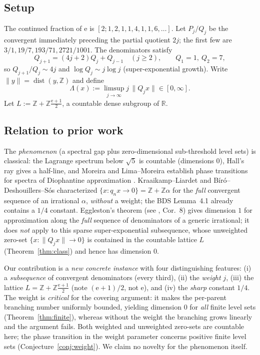 \documentclass[11pt]{article}
\theoremstyle{definition}
\theoremstyle{remark}
\newcommand{\R}{\mathbb{R}}
\newcommand{\Z}{\mathbb{Z}}
\newcommand{\ee}{\mathrm{e}}
\newcommand{\dist}{\operatorname{dist}}
\newcommand{\Lam}{\Lambda}
\begin{document}
\subsection{Setup}

The continued fraction of $\ee$ is $[2;1,2,1,1,4,1,1,6,\dots]$. Let $P_j/Q_j$
be the convergent immediately preceding the partial quotient $2j$; the first
few are $3/1,19/7,193/71,2721/1001$. The denominators satisfy
\begin{equation}\label{eq:rec}
Q_{j+1}=(4j+2)Q_j+Q_{j-1}\quad(j\ge2),\qquad Q_1=1,\ Q_2=7,
\end{equation}
so $Q_{j+1}/Q_j\sim 4j$ and $\log Q_j\sim j\log j$ (super-exponential growth).
Write $\|y\|=\dist(y,\Z)$ and define
\[
\Lam(x):=\limsup_{j\to\infty} j\,\|Q_j x\|\in[0,\infty].
\]
Let $L:=\Z+\Z\frac{\ee+1}{2}$, a countable dense subgroup of $\R$.

\subsection{Relation to prior work}\label{sec:prior}

The \emph{phenomenon} (a spectral gap plus zero-dimensional sub-threshold level
sets) is classical: the Lagrange spectrum below $\sqrt5$ is countable
(dimensions $0$), Hall's ray gives a half-line, and Moreira and Lima--Moreira
establish phase transitions for spectra of Diophantine approximation
\cite{Moreira,LimaMoreira}. Kraaikamp--Liardet \cite{KL} and
B\'ir\'o--Deshouillers--S\'os \cite{BDS} characterized
$\{x:q_n x\to0\}=\Z+\Z\alpha$ for the \emph{full} convergent sequence of an
irrational $\alpha$, \emph{without} a weight; the BDS Lemma~4.1 already contains
a $1/4$ constant. Eggleston's theorem (see \cite{BLR}, Cor.~8) gives dimension
$1$ for approximation along the \emph{full} sequence of denominators of a
generic irrational; it does \emph{not} apply to this sparse super-exponential
subsequence, whose unweighted zero-set $\{x:\|Q_jx\|\to0\}$ is contained in the
countable lattice $L$ (Theorem~\ref{thm:class}) and hence has dimension $0$.

Our contribution is a \emph{new concrete instance} with four distinguishing
features: (i) a \emph{subsequence} of convergent denominators (every third),
(ii) the \emph{weight} $j$, (iii) the lattice $L=\Z+\Z\frac{\ee+1}{2}$ (note
$(\ee+1)/2$, not $\ee$), and (iv) the \emph{sharp} constant $1/4$. The weight is
\emph{critical} for the covering argument: it makes the per-parent branching
number uniformly bounded, yielding dimension $0$ for \emph{all} finite level
sets (Theorem~\ref{thm:finite}), whereas without the weight the branching grows
linearly and the argument fails. Both weighted and unweighted zero-sets are
countable here; the phase transition in the weight parameter concerns positive
finite level sets (Conjecture~\ref{conj:weight}). We claim no novelty for the
phenomenon itself.
\end{document}
